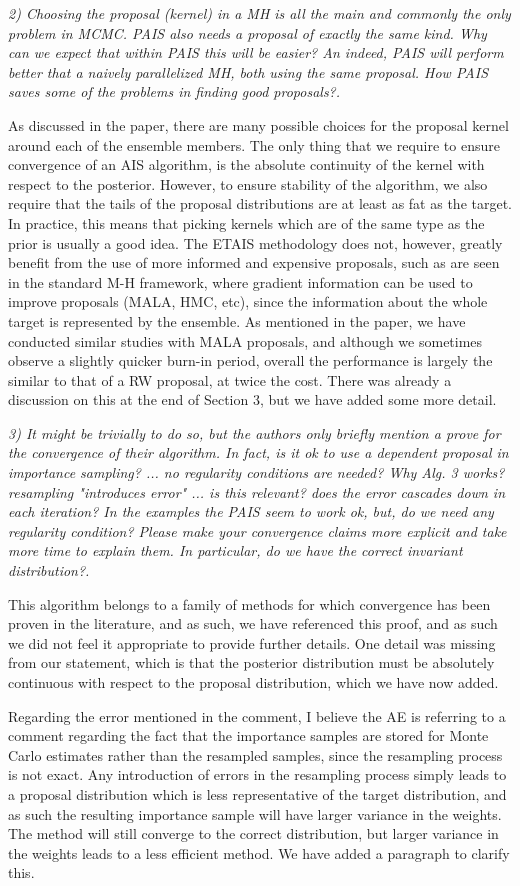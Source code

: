 \documentclass{article}
\newcommand{\comment}[2]{\vspace{0.6cm}{\bf Comment:} {\it #1.}

\vspace{0.3cm}{\bf Answer:} #2}
\begin{document}
\comment{2) Choosing the proposal (kernel) in a MH is all the main and commonly the only problem in MCMC. PAIS also needs a proposal of exactly the same kind. Why can we expect that within PAIS this will be easier? An indeed, PAIS will perform better that a naively parallelized MH, both using the same proposal. How PAIS saves some of the problems in finding good proposals?}{As discussed in the paper, there are many possible choices for the proposal kernel around each of the ensemble members. The only thing that we require to ensure convergence of an AIS algorithm, is the absolute continuity of the kernel with respect to the posterior. However, to ensure stability of the algorithm, we also require that the tails of the proposal distributions are at least as fat as the target. In practice, this means that picking kernels which are of the same type as the prior is usually a good idea. The ETAIS methodology does not, however, greatly benefit from the use of more informed and expensive proposals, such as are seen in the standard M-H framework, where gradient information can be used to improve proposals (MALA, HMC, etc), since the information about the whole target is represented by the ensemble. As mentioned in the paper, we have conducted similar studies with MALA proposals, and although we sometimes observe a slightly quicker burn-in period, overall the performance is largely the similar to that of a RW proposal, at twice the cost. There was already a discussion on this at the end of Section 3, but we have added some more detail.}

\comment{3) It might be trivially to do so, but the authors only briefly mention a prove for the convergence of their algorithm. In fact, is it ok to use a dependent proposal in importance sampling? ... no regularity conditions are needed? Why Alg. 3 works? resampling "introduces error" ... is this relevant? does the error cascades down in each iteration? In the examples the PAIS seem to work ok, but, do we need any regularity condition? Please make your convergence claims more explicit and take more time to explain them. In particular, do we have the correct invariant distribution?}{This algorithm belongs to a family of methods for which convergence has been proven in the literature, and as such, we have referenced this proof, and as such we did not feel it appropriate to provide further details. One detail was missing from our statement, which is that the posterior distribution must be absolutely continuous with respect to the proposal distribution, which we have now added.

Regarding the error mentioned in the comment, I believe the AE is referring to a comment regarding the fact that the importance samples are stored for Monte Carlo estimates rather than the resampled samples, since the resampling process is not exact. Any introduction of errors in the resampling process simply leads to a proposal distribution which is less representative of the target distribution, and as such the resulting importance sample will have larger variance in the weights. The method will still converge to the correct distribution, but larger variance in the weights leads to a less efficient method. We have added a paragraph to clarify this.}
\end{document}
